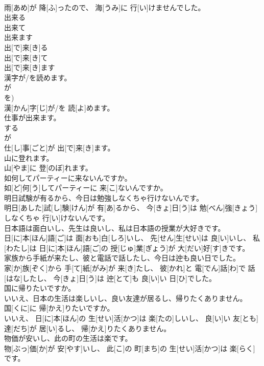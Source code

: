 \documentclass[8pt]{extreport}
\begin{document}
\begin{CJK}{UTF8}{min}
\\	雨[あめ]が 降[ふ]ったので、 海[うみ]に 行[い]けませんでした。
\\	出来る 
\\	出来て 
\\	出来ます	
\\	出[で]来[き]る 
\\	出[で]来[き]て 
\\	出[で]来[き]ます
\\	漢字が/を読めます。 
\\	が 
\\	を)	
\\	漢[かん]字[じ]が/を 読[よ]めます。
\\	仕事が出来ます。 
\\	する 
\\	が 
\\	仕[し]事[ごと]が 出[で]来[き]ます。
\\	山に登れます。	
\\	山[やま]に 登[のぼ]れます。
\\	如何してパーティーに来ないんですか。	
\\	如[ど]何[う]してパーティーに 来[こ]ないんですか。
\\	明日試験が有るから、今日は勉強しなくちゃ行けないんです。	
\\	明日[あした]試[し]験[けん]が 有[あ]るから、 今[きょ]日[う]は 勉[べん]強[きょう]しなくちゃ 行[い]けないんです。
\\	日本語は面白いし、先生は良いし、私は日本語の授業が大好きです。	
\\	日[に]本[ほん]語[ご]は 面[おも]白[しろ]いし、 先[せん]生[せい]は 良[い]いし、 私[わたし]は 日[に]本[ほん]語[ご]の 授[じゅ]業[ぎょう]が 大[だい]好[す]きです。
\\	家族から手紙が来たし、彼と電話で話したし、今日は迚も良い日でした。	
\\	家[か]族[ぞく]から 手[て]紙[がみ]が 来[き]たし、 彼[かれ]と 電[でん]話[わ]で 話[はな]したし、 今[きょ]日[う]は 迚[とて]も 良[い]い 日[ひ]でした。
\\	国に帰りたいですか。 
\\	いいえ、日本の生活は楽しいし、良い友達が居るし、帰りたくありません。	
\\	国[くに]に 帰[かえ]りたいですか。 
\\	いいえ、 日[に]本[ほん]の 生[せい]活[かつ]は 楽[たの]しいし、 良[い]い 友[とも]達[だち]が 居[い]るし、 帰[かえ]りたくありません。
\\	物価が安いし、此の町の生活は楽です。	
\\	物[ぶっ]価[か]が 安[やす]いし、 此[こ]の 町[まち]の 生[せい]活[かつ]は 楽[らく]です。

\end{CJK}
\end{document}
